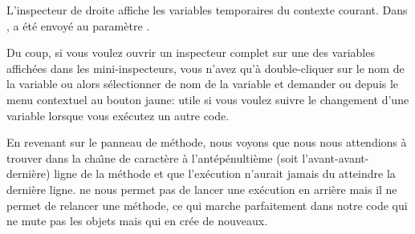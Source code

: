 \documentclass[a4paper,10pt,twoside]{book}
\begin{document}
L'inspecteur de droite affiche les variables temporaires du contexte courant.
Dans ,
 a \'et\'e envoy\'e au param\`etre .


Du coup, si vous voulez ouvrir un inspecteur complet sur une des variables
affich\'ees dans les mini-inspecteurs, vous n'avez qu'\`a double-cliquer
sur le nom de la variable ou alors s\'electionner de nom de la variable et 
demander 
  ou 
depuis le menu contextuel au bouton jaune:
utile si vous voulez suivre 
le changement d'une variable lorsque vous ex\'ecutez un autre code.

En revenant sur le panneau de m\'ethode, nous voyons que nous
nous attendions \`a trouver  dans la cha\^{\i}ne de caract\`ere
 \`a l'ant\'ep\'enulti\`eme (soit l'avant-avant-derni\`ere) 
ligne de la m\'ethode et que l'ex\'ecution n'aurait jamais du atteindre
la derni\`ere ligne.
\pharo ne nous permet pas de lancer une ex\'ecution en arri\`ere mais
il ne permet de relancer une m\'ethode, ce qui marche parfaitement dans
notre code qui ne mute pas les objets mais qui en cr\'ee de nouveaux.

\end{document}
